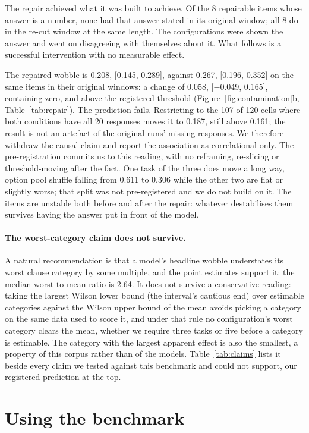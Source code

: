\documentclass[11pt]{article}
\begin{document}
The repair achieved what it was built to achieve. Of the 8
repairable items whose answer is a number, none had that answer stated in its original window; all
8 do in the re-cut window at the same length. The configurations were shown the
answer and went on disagreeing with themselves about it. What follows is a successful
intervention with no measurable effect.

The repaired wobble is 0.208, [0.145, 0.289], against 0.267, [0.196, 0.352] on the same items in
their original windows: a change of 0.058, [$-$0.049, 0.165], containing zero, and above the
registered threshold (Figure~\ref{fig:contamination}b, Table~\ref{tab:repair}). The prediction
fails. Restricting to the 107 of 120 cells where both conditions have all 20 responses moves it to
0.187, still above 0.161; the result is not an artefact of the original runs' missing
responses. We therefore withdraw the causal claim and report the association as correlational
only. The pre-registration commits us to this reading, with no reframing, re-slicing or
threshold-moving after the fact. One task of the three does move a long way, option
pool shuffle falling from 0.611 to 0.306 while the other two are flat or slightly worse; that
split was not pre-registered and we do not build on it. The items are unstable both before and
after the repair: whatever destabilises them survives having the answer put in front of the
model.

\paragraph{The worst-category claim does not survive.} A natural recommendation is that a model's
headline wobble understates its worst clause category by some multiple, and the point estimates
support it: the median worst-to-mean ratio is 2.64. It does not survive a conservative reading:
taking the largest Wilson lower bound (the interval's cautious end) over estimable categories
against the Wilson upper bound of the mean avoids picking a category on the same data used to
score it, and under that rule no configuration's worst category clears the mean, whether we
require three tasks or five before a category is estimable. The category with the largest
apparent effect is also the smallest, a property of this corpus rather than of the models.
Table~\ref{tab:claims} lists it beside every claim we tested against this benchmark and could not
support, our registered prediction at the top.

\section{Using the benchmark}
\label{sec:using}
\end{document}
